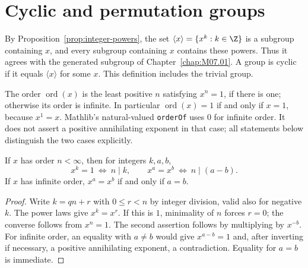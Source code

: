 \chapter{Cyclic and permutation groups}\label{chap:M07.02}

By Proposition~\ref{prop:integer-powers}, the set
$\langle x\rangle=\{x^k:k\in\Z\}$ is a subgroup containing $x$, and every subgroup containing $x$ contains these powers. Thus it agrees with the generated subgroup of Chapter~\ref{chap:M07.01}. A group is cyclic if it equals $\langle x\rangle$ for some $x$. This definition includes the trivial group.

The order $\operatorname{ord}(x)$ is the least positive $n$ satisfying $x^n=1$, if there is one; otherwise its order is infinite. In particular $\operatorname{ord}(x)=1$ if and only if $x=1$, because $x^1=x$. Mathlib's natural-valued \texttt{orderOf} uses $0$ for infinite order. It does not assert a positive annihilating exponent in that case; all statements below distinguish the two cases explicitly.

\begin{proposition}\label{prop:order-divisibility}
If $x$ has order $n<\infty$, then for integers $k,a,b$,
\[
 x^k=1\ \Longleftrightarrow\ n\mid k,
 \qquad x^a=x^b\ \Longleftrightarrow\ n\mid(a-b).
\]
If $x$ has infinite order, $x^a=x^b$ if and only if $a=b$.
\end{proposition}
\begin{proof}
Write $k=qn+r$ with $0\leq r<n$ by integer division, valid also for negative $k$. The power laws give $x^k=x^r$. If this is $1$, minimality of $n$ forces $r=0$; the converse follows from $x^n=1$. The second assertion follows by multiplying by $x^{-b}$. For infinite order, an equality with $a\ne b$ would give $x^{a-b}=1$ and, after inverting if necessary, a positive annihilating exponent, a contradiction. Equality for $a=b$ is immediate.
\end{proof}

